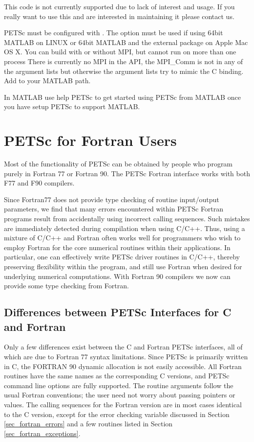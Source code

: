 This code is not currently supported due to lack of interest and usage. If you really want to use this and are interested in maintaining it please contact us.

PETSc must be configured with    . The option  must be used if using 64bit MATLAB on LINUX or 64bit MATLAB and the  external package on Apple Mac OS X.
You can build with or without MPI, but cannot run on more than one process
There is currently no MPI in the API, the MPI_Comm is not in any of the argument lists but otherwise the argument lists try to mimic the C binding.
Add  to your MATLAB path.

In MATLAB use help PETSc to get started using PETSc from MATLAB once you have setup PETSc to support MATLAB.


\cleardoublepage
\chapter{PETSc for Fortran Users}
\label{ch_fortran}

Most of the functionality of PETSc can be obtained by people who
program purely in Fortran 77 or Fortran 90.
The PETSc Fortran interface works with both F77 and F90 compilers.

Since Fortran77 does not provide type checking of routine input/output
parameters, we find that many errors encountered within PETSc Fortran
programs result from accidentally using incorrect calling sequences.
Such mistakes are immediately detected during compilation when using
C/C++.  Thus, using a mixture of C/C++ and Fortran often works well
for programmers who wish to employ Fortran for the core numerical
routines within their applications.  In particular, one can
effectively write PETSc driver routines in C/C++, thereby preserving
flexibility within the program, and still use Fortran when desired for
underlying numerical computations. With Fortran 90 compilers we now
can provide some type checking from Fortran.

\section{Differences between PETSc Interfaces for C and Fortran}

Only a few differences exist between the C and Fortran PETSc
interfaces, all of which are due to Fortran 77 syntax limitations.
Since PETSc is primarily written in C, the FORTRAN 90
dynamic allocation is not easily accessible.
All Fortran routines have the same names as the corresponding C
versions, and PETSc command line options are fully supported. The
routine arguments follow the usual Fortran conventions; the user need
not worry about passing pointers or values.  The calling sequences
for the Fortran version are in most cases identical to the C version,
except for the error checking variable discussed in
Section \ref{sec_fortran_errors} and a few routines listed in
Section \ref{sec_fortran_exceptions}.

